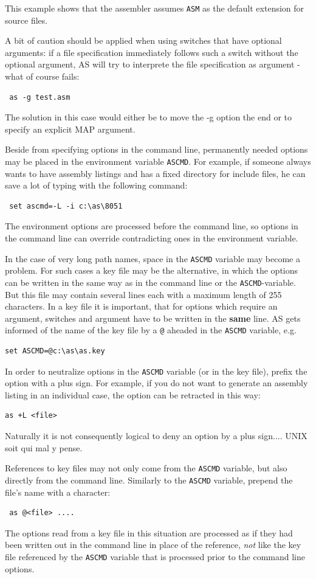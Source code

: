 \documentclass[12pt,twoside]{report}
\newcommand{\bb}[1]{{\bf #1}}
\newcommand{\tty}[1]{{\tt #1}}
\newcommand{\asname}{{AS}}
\begin{document}
This example shows that the assembler assumes \tty{ASM} as the default
extension for source files.

A bit of caution should be applied when using switches that have
optional arguments: if a file specification immediately follows such
a switch without the optional argument, \asname{} will try to interprete the
file specification as argument - what of course fails:
\begin{verbatim}
 as -g test.asm
\end{verbatim}
The solution in this case would either be to move the -g option the
end or to specify an explicit MAP argument.


Beside from specifying options in the command line, permanently
needed options may be placed in the environment variable \tty{ASCMD}.  For
example, if someone always wants to have assembly listings and has a
fixed directory for include files, he can save a lot of typing with
the following command:
\begin{verbatim}
 set ascmd=-L -i c:\as\8051
\end{verbatim}
The environment options are processed before the command line,
so options in the command line can override contradicting ones in the
environment variable.

In the case of very long path names, space in the \tty{ASCMD} variable may
become a problem.  For such cases a key file may be the alternative,
in which the options can be written in the same way as in the command
line or the \tty{ASCMD}-variable.  But this file may contain several lines
each with a maximum length of 255 characters.  In a key file it is
important, that for options which require an argument, switches and
argument have to be written in the \bb{same} line.  \asname{} gets informed of
the name of the key file by a \tty{@} aheaded in the \tty{ASCMD} variable,
e.g.
\begin{verbatim}
set ASCMD=@c:\as\as.key
\end{verbatim}
In order to neutralize options in the \tty{ASCMD} variable (or in the
key file), prefix the option with a plus sign.  For example, if you
do not want to generate an assembly listing in an individual case,
the option can be retracted in this way:
\begin{verbatim}
as +L <file>
\end{verbatim}
Naturally it is not consequently logical to deny an option by a
plus sign....  UNIX soit qui mal y pense.

References to key files may not only come from the {\tt ASCMD} variable,
but also directly from the command line.  Similarly to the {\tt ASCMD}
variable, prepend the file's name with a \@ character:
\begin{verbatim}
 as @<file> ....
\end{verbatim}
The options read from a key file in this situation are processed as if
they had been written out in the command line in place of the reference,
{\em not} like the key file referenced by the {\tt ASCMD} variable that is
processed prior to the command line options.
\end{document}
